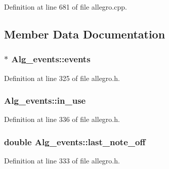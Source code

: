 Definition at line 681 of file allegro.\+cpp.



\subsection{Member Data Documentation}
\subsubsection[{\texorpdfstring{events}{events}}]{$\ast$ Alg\+\_\+events\+::events\hspace{0.3cm}{\ttfamily [protected]}}\hypertarget{class_alg__events_a223e3022acbbb386c1cbc6346054c5d3}{}\label{class_alg__events_a223e3022acbbb386c1cbc6346054c5d3}


Definition at line 325 of file allegro.\+h.

\subsubsection[{\texorpdfstring{in\+\_\+use}{in_use}}]{ Alg\+\_\+events\+::in\+\_\+use}\hypertarget{class_alg__events_a26ad846e460a39e3c69b0dbee121a546}{}\label{class_alg__events_a26ad846e460a39e3c69b0dbee121a546}


Definition at line 336 of file allegro.\+h.

\subsubsection[{\texorpdfstring{last\+\_\+note\+\_\+off}{last_note_off}}]{\setlength{\rightskip}{0pt plus 5cm}double Alg\+\_\+events\+::last\+\_\+note\+\_\+off}\hypertarget{class_alg__events_ab0a98f7d3e8bc899d98936fed6e4aeed}{}\label{class_alg__events_ab0a98f7d3e8bc899d98936fed6e4aeed}


Definition at line 333 of file allegro.\+h.

